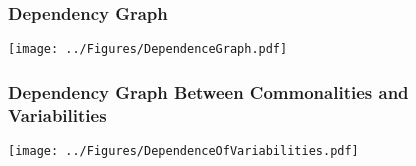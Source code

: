 \documentclass[t,12pt,numbers,fleqn]{beamer}
\begin{document}

\begin{frame}

\frametitle{Dependency Graph} %

\begin{center}
{
\texttt{[image: ../Figures/DependenceGraph.pdf]}
}
\end{center}

\end{frame}


\begin{frame}

\frametitle{Dependency Graph Between Commonalities and Variabilities}

\begin{center}
{
\texttt{[image: ../Figures/DependenceOfVariabilities.pdf]}
}
\end{center}

\end{frame}

\end{document}
